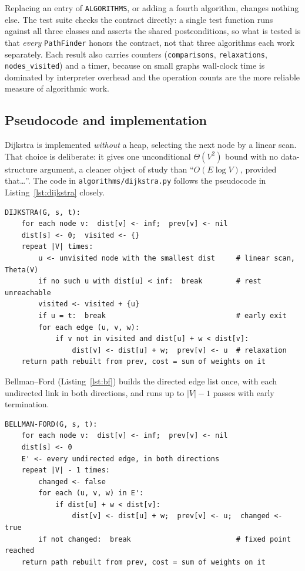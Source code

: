 \documentclass[11pt,a4paper]{article}
\begin{document}
Replacing an entry of \texttt{ALGORITHMS}, or adding a fourth algorithm, changes nothing else.
The test suite checks the contract directly: a single test function runs against all three
classes and asserts the shared postconditions, so what is tested is that \emph{every}
\texttt{PathFinder} honors the contract, not that three algorithms each work separately.
Each result also carries counters (\texttt{comparisons}, \texttt{relaxations},
\texttt{nodes\_visited}) and a timer, because on small graphs wall-clock time is dominated by
interpreter overhead and the operation counts are the more reliable measure of algorithmic work.

\subsection{Pseudocode and implementation}
\label{sec:pseudo}

Dijkstra is implemented \emph{without} a heap, selecting the next node by a linear scan. That
choice is deliberate: it gives one unconditional $\Theta(V^2)$ bound with no data-structure
argument, a cleaner object of study than ``$O(E\log V)$, provided that\ldots''. The code in
\texttt{algorithms/dijkstra.py} follows the pseudocode in Listing~\ref{lst:dijkstra} closely.

\begin{lstlisting}[language={}, caption={Dijkstra with array-based selection (algorithms/dijkstra.py).}, label={lst:dijkstra}]
DIJKSTRA(G, s, t):
    for each node v:  dist[v] <- inf;  prev[v] <- nil
    dist[s] <- 0;  visited <- {}
    repeat |V| times:
        u <- unvisited node with the smallest dist     # linear scan, Theta(V)
        if no such u with dist[u] < inf:  break        # rest unreachable
        visited <- visited + {u}
        if u = t:  break                               # early exit
        for each edge (u, v, w):
            if v not in visited and dist[u] + w < dist[v]:
                dist[v] <- dist[u] + w;  prev[v] <- u  # relaxation
    return path rebuilt from prev, cost = sum of weights on it
\end{lstlisting}

Bellman--Ford (Listing~\ref{lst:bf}) builds the directed edge list once, with each undirected
link in both directions, and runs up to $|V|-1$ passes with early termination.

\begin{lstlisting}[language={}, caption={Bellman-Ford with early termination (algorithms/bellman_ford.py).}, label={lst:bf}]
BELLMAN-FORD(G, s, t):
    for each node v:  dist[v] <- inf;  prev[v] <- nil
    dist[s] <- 0
    E' <- every undirected edge, in both directions
    repeat |V| - 1 times:
        changed <- false
        for each (u, v, w) in E':
            if dist[u] + w < dist[v]:
                dist[v] <- dist[u] + w;  prev[v] <- u;  changed <- true
        if not changed:  break                         # fixed point reached
    return path rebuilt from prev, cost = sum of weights on it
\end{lstlisting}
\end{document}
